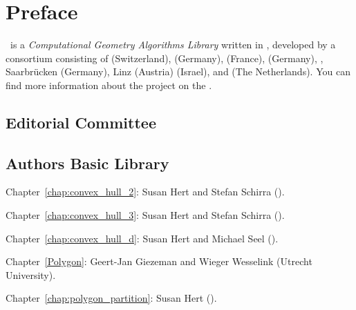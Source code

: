 \chapter{Preface}


\cgal\ is a {\em Computational Geometry Algorithms Library} written in \CC, 
developed by a consortium consisting of
 (Switzerland), 
 (Germany), 
 (France),
 (Germany),
,
Saarbr\"ucken (Germany),
 Linz (Austria)
 (Israel), and
 (The Netherlands). 
You can find more information about the project on the 
.




\section*{Editorial Committee}





\section*{Authors Basic Library}

\noindent
Chapter~\ref{chap:convex_hull_2}: Susan Hert and Stefan Schirra 
().

\noindent
Chapter~\ref{chap:convex_hull_3}: Susan Hert and Stefan Schirra 
().

\noindent
Chapter~\ref{chap:convex_hull_d}: Susan Hert and Michael Seel 
().

\noindent
Chapter~\ref{Polygon}: Geert-Jan Giezeman and Wieger Wesselink 
(Utrecht University).

\noindent
Chapter~\ref{chap:polygon_partition}: Susan Hert 
().

